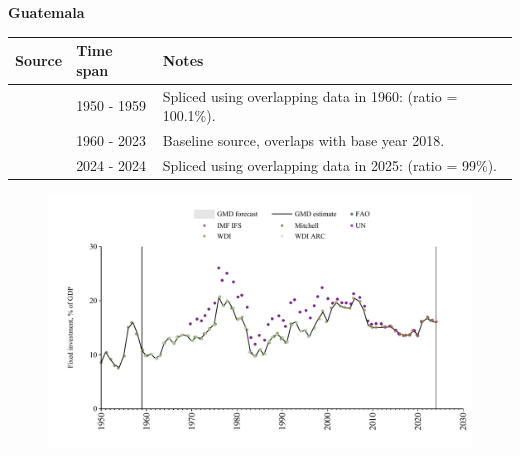 \documentclass[12pt,a4paper,landscape]{article}
\begin{document}
\begin{adjustbox}{max totalsize={\paperwidth}{\paperheight},center}
\begin{minipage}[t][\textheight][t]{\textwidth}
\vspace*{0.5cm}
{}
\begin{center}
{\Large\bfseries Guatemala}
\end{center}
\vspace{0.5cm}
\begin{table}[H]
\centering
\small
\begin{tabular}{|l|l|l|}
\hline
\textbf{Source} & \textbf{Time span} & \textbf{Notes} \\
\hline
\rowcolor{white}\cite{Mitchell}& 1950 - 1959 &Spliced using overlapping data in 1960: (ratio = 100.1\%).\\
\rowcolor{lightgray}\cite{WDI}& 1960 - 2023 &Baseline source, overlaps with base year 2018.\\
\rowcolor{white}\cite{IMF_IFS}& 2024 - 2024 &Spliced using overlapping data in 2025: (ratio = 99\%).\\
\hline
\end{tabular}
\end{table}
\begin{figure}[H]
\centering
\includegraphics[width=\textwidth,height=0.6\textheight,keepaspectratio]{graphs/GTM_finv_GDP.pdf}
\end{figure}
\end{minipage}
\end{adjustbox}
\end{document}
